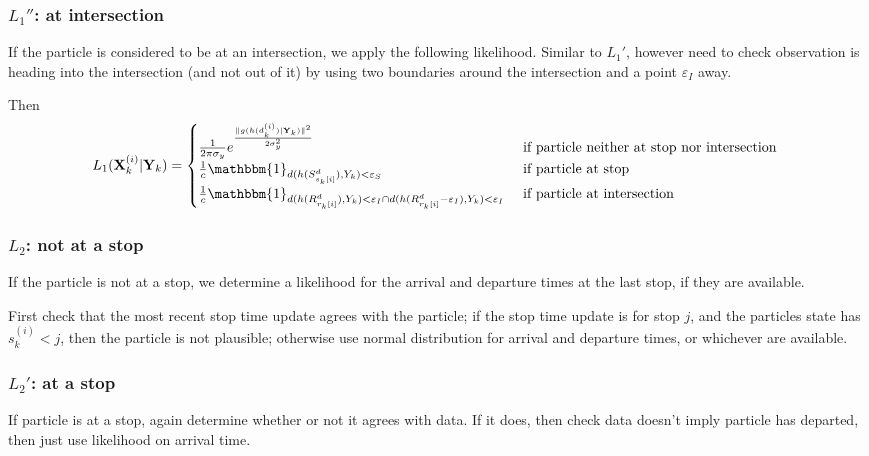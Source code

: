 \documentclass[draftcls,a4paper,onecolumn]{IEEEtran}\usepackage[]{graphicx}\usepackage[]{color}
\begin{document}
\subsubsection[L1c]{$L_1''$: at intersection}

If the particle is considered to be at an intersection, we apply the following likelihood.
Similar to $L_1'$, however need to check observation is heading into the intersection
(and not out of it) by using two boundaries around the intersection and a point $\varepsilon_I$ away.


Then 
\begin{equation}
  L_1(\bX_k^{(i)} | \bY_k) =
  \begin{cases}
    \frac{1}{2\pi\sigma_y} e^{\frac{\|g(h(d_k^{(i)})|\bY_k)\|^2}{2\sigma_y^2}} & \text{ if particle neither at stop nor intersection } \\
    \frac{1}{c} \mathbbm{1}_{d(h(S_{s_k{[i]}}^d), Y_k) < \varepsilon_S}    & \text{ if particle at stop } \\
    \frac{1}{c} \mathbbm{1}_{d(h(R_{r_k{[i]}}^d), Y_k) < \varepsilon_I \cap d(h(R_{r_k{[i]}}^d-\varepsilon_I), Y_k) < \varepsilon_I}    & \text{ if particle at intersection }
  \end{cases}
\end{equation}


\subsubsection[L2]{$L_2$: not at a stop}

If the particle is not at a stop, we determine a likelihood for the arrival and departure
times at the last stop, if they are available.

First check that the most recent stop time update agrees with the particle;
if the stop time update is for stop $j$, and the particles state has $s_k^{(i)} < j$,
then the particle is not plausible;
otherwise use normal distribution for arrival and departure times,
or whichever are available.


\subsubsection[L2b]{$L_2'$: at a stop}

If particle is at a stop, again determine whether or not it agrees with data.
If it does, then check data doesn't imply particle has departed,
then just use likelihood on arrival time.
\end{document}
